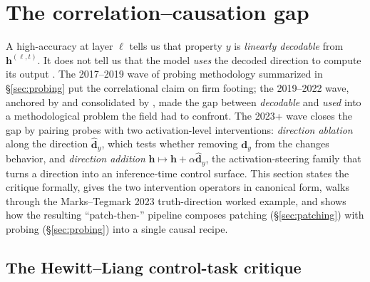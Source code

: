 
\section{The correlation--causation gap}
\label{sec:correlation-causation}

A high-accuracy  at layer $\ell$ tells us that property $y$ is
\emph{linearly decodable} from $\mathbf{h}^{(\ell, t)}$. It does not
tell us that the model \emph{uses} the decoded direction to compute its
output \citep{belinkov2022-probing-survey}. The 2017--2019 wave of
probing methodology summarized in \S\ref{sec:probing} put the
correlational claim on firm footing; the 2019--2022 wave, anchored by
\citet{hewitt2019-control-tasks} and consolidated by
\citet{belinkov2022-probing-survey}, made the gap between
\emph{decodable} and \emph{used} into a methodological problem the
field had to confront. The 2023+ wave closes the gap by pairing
probes with two activation-level interventions: \emph{direction
ablation} along the  direction $\hat{\mathbf{d}}_y$, which tests
whether removing $\mathbf{d}_y$ from the  changes
behavior, and \emph{direction addition} $\mathbf{h} \mapsto \mathbf{h} +
\alpha \hat{\mathbf{d}}_y$, the activation-steering family that turns
a  direction into an inference-time control surface. This section
states the critique formally, gives the two intervention operators in
canonical form, walks through the Marks--Tegmark 2023 truth-direction
worked example, and shows how the resulting ``patch-then-''
pipeline composes patching (\S\ref{sec:patching}) with probing
(\S\ref{sec:probing}) into a single causal recipe.

\subsection{The Hewitt--Liang control-task critique}
\label{sec:control-tasks}

